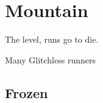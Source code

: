 \chapter{Mountain}
\setlength{\epigraphwidth}{0.7\textwidth}
\renewcommand{\epigraphflush}{center}

\epigraph{The level, runs go to die.}{Many Glitchless runners}


\section{Frozen}
